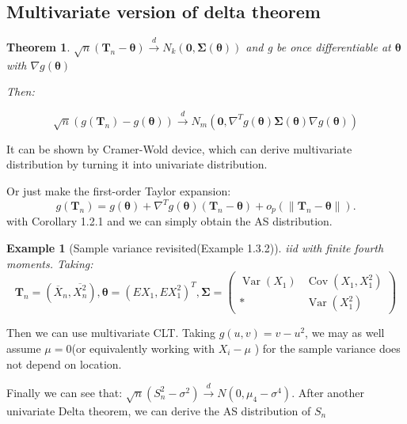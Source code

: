 \documentclass{ctexart}
\newtheorem{theorem}{Theorem}[subsection]
\newtheorem{example}{Example}[subsection]
\begin{document}
\subsection{Multivariate version of delta theorem}
\begin{theorem}
  \(\sqrt{n}(\boldsymbol{T}_{n}-\boldsymbol{\theta})\xrightarrow{d}N_{k}(\boldsymbol{0},\boldsymbol{\Sigma(\boldsymbol{\theta})})\) and g be once differentiable at \(\boldsymbol{\theta}\) with \(\nabla g(\boldsymbol{\theta})\)
  
  Then: 

  \[
  \sqrt{n}(g(\boldsymbol{T}_{n})-g(\boldsymbol{\theta})) \xrightarrow{d}N_{m}(\boldsymbol{0},\nabla^{T}g(\boldsymbol{\theta})\boldsymbol{\Sigma}(\boldsymbol{\theta})\nabla g(\boldsymbol{\theta}))
  \] 
\end{theorem}
It can be shown by Cramer-Wold device, which can derive multivariate distribution by turning it into univariate distribution. 

Or just make the first-order Taylor expansion: 
\[
g(\boldsymbol{T}_n)=g(\boldsymbol{\theta})+\nabla^{T} g(\boldsymbol{\theta})(\boldsymbol{T}_{n}-\boldsymbol{\theta})+o_p(\|\boldsymbol{T}_{n}-\boldsymbol{\theta}\|).
\] 
with Corollary 1.2.1 and we can simply obtain the AS distribution. 

\begin{example}[Sample variance revisited(Example 1.3.2)]
  iid with finite fourth moments. Taking: 
  \[
  \boldsymbol{T}_{n}=(\overline{X}_{n},\overline{X^{2}_{n}}),\boldsymbol{\theta}=(EX_{1},EX_{1}^{2})^{T},\boldsymbol{\Sigma}=\begin{pmatrix}
    \operatorname{Var}(X_{1})&\operatorname{Cov}(X_{1},X_{1}^{2})\\ * &\operatorname{Var}(X_{1}^{2})
  \end{pmatrix}
  \]                                           
\end{example}
Then we can use multivariate CLT. Taking \(g(u,v)=v-u^{2}\), we may as well assume \(\mu=0\)(or equivalently working with \(X_{i}-\mu\) ) for the sample variance does not depend on location. 

Finally we can see that: \(\sqrt{n}(S_{n}^{2}-\sigma^{2})\xrightarrow{d}N(0,\mu_{4}-\sigma^{4})\). After another univariate Delta theorem, we can derive the AS distribution of \(S_{n}\)  
\end{document}
